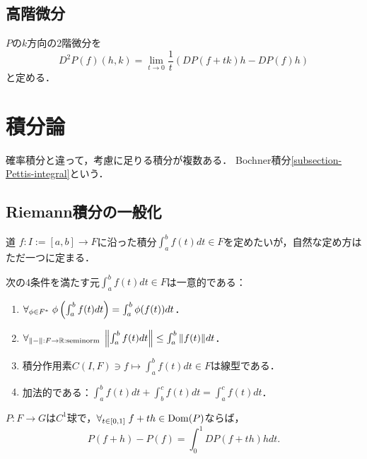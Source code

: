 \documentclass[uplatex,dvipdfmx]{jsreport}
\begin{document}
\subsection{高階微分}

\begin{definition}
    $P$の$k$方向の2階微分を
    \[D^2P(f)(h,k)=\lim_{t\to0}\frac{1}{t}(DP(f+tk)h-DP(f)h)\]
    と定める．
\end{definition}

\section{積分論}

\begin{tcolorbox}[colframe=ForestGreen, colback=ForestGreen!10!white,breakable,colbacktitle=ForestGreen!40!white,coltitle=black,fonttitle=\bfseries\sffamily,
title=]
    確率積分と違って，考慮に足りる積分が複数ある．
    Bochner積分\ref{subsection-Pettis-integral}という．
\end{tcolorbox}

\subsection{Riemann積分の一般化}

\begin{notation}
    道
    $f:I:=[a,b]\to F$に沿った積分$\int^b_af(t)dt\in F$を定めたいが，自然な定め方はただ一つに定まる．
\end{notation}

\begin{theorem}
    次の4条件を満たす元$\int^b_af(t)dt\in F$は一意的である：
    \begin{enumerate}
        \item $\forall_{\phi\in F^*}\;\phi\left(\int^b_af(t)dt\right)=\int^b_a\phi(f(t))dt$．
        \item $\forall_{\|-\|:F\to\mathbb{R}:\text{seminorm}}\;\left\|\int^b_af(t)dt\right\|\le\int^b_a\|f(t)\|dt$．
        \item 積分作用素$C(I,F)\ni f\mapsto \int^b_af(t)dt\in F$は線型である．
        \item 加法的である：$\int^b_af(t)dt+\int^c_bf(t)dt=\int^c_af(t)dt$．
    \end{enumerate}
\end{theorem}

\begin{theorem}[微積分学の基本定理]
    $P:F\to G$は$C^1$球で，$\forall_{t\in[0,1]}\;f+th\in\mathrm{Dom}(P)$ならば，
    \[P(f+h)-P(f)=\int^1_0DP(f+th)hdt.\]
\end{theorem}
\end{document}
